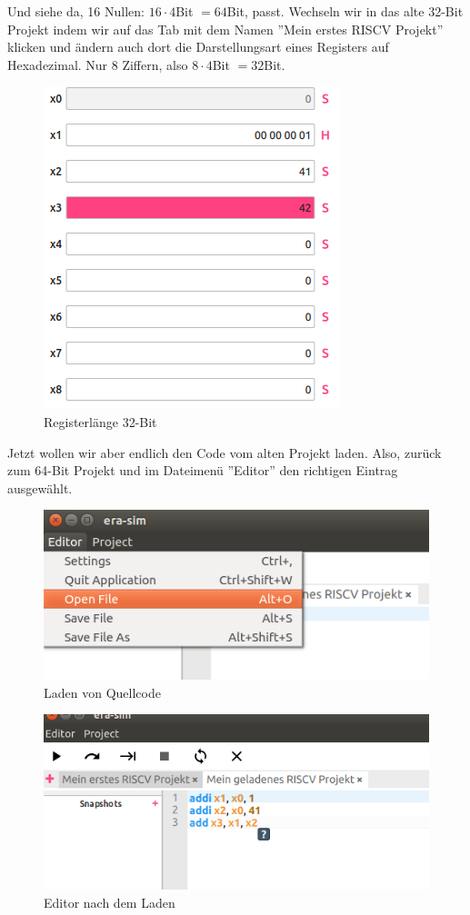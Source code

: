 Und siehe da, 16 Nullen: $16 \cdot 4$Bit $=64$Bit, passt. Wechseln wir in das alte 32-Bit Projekt indem wir auf das Tab mit dem Namen ''Mein erstes RISCV Projekt'' klicken und ändern auch dort die Darstellungsart eines Registers auf Hexadezimal. Nur 8 Ziffern, also $8 \cdot 4$Bit $=32$Bit.
\begin{figure}[H]
	\centering
	\includegraphics[scale=1.0]{Images/first-steps-10.png}
	\caption{Registerlänge 32-Bit}
\end{figure}

Jetzt wollen wir aber endlich den Code vom alten Projekt laden. Also, zurück zum 64-Bit Projekt und im Dateimenü ''Editor'' den richtigen Eintrag ausgewählt.
\begin{figure}[H]
	\centering
	\includegraphics[scale=1.0]{Images/first-steps-11.png}
	\caption{Laden von Quellcode}
\end{figure}

\begin{figure}[H]
	\centering
	\includegraphics[scale=1.0]{Images/first-steps-12.png}
	\caption{Editor nach dem Laden}
\end{figure}

